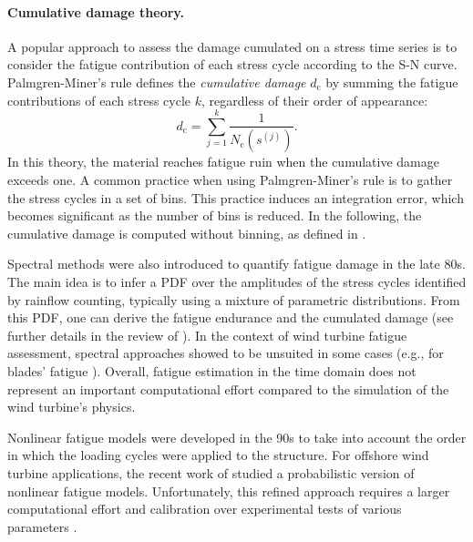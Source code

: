 \paragraph{Cumulative damage theory.}
A popular approach to assess the damage cumulated on a stress time series is to consider the fatigue contribution of each stress cycle according to the S-N curve. 
Palmgren-Miner's rule defines the \textit{cumulative damage} $d_{\mathrm{c}}$ by summing the fatigue contributions of each stress cycle $k$, regardless of their order of appearance:
\begin{equation}
    d_{\mathrm{c}} = \sum_{j=1}^{k} \frac{1}{N_{\mathrm{c}}\left(s^{(j)}\right)}.
    \label{eq:miner}
\end{equation}
In this theory, the material reaches fatigue ruin when the cumulative damage exceeds one.  
A common practice when using Palmgren-Miner's rule is to gather the stress cycles in a set of bins. 
This practice induces an integration error, which becomes significant as the number of bins is reduced. 
In the following, the cumulative damage is computed without binning, as defined in .

Spectral methods were also introduced to quantify fatigue damage in the late 80s. 
The main idea is to infer a PDF over the amplitudes of the stress cycles identified by rainflow counting, typically using a mixture of parametric distributions. 
From this PDF, one can derive the fatigue endurance and the cumulated damage (see further details in the review of \citealp{dirlik_2021}). 
In the context of wind turbine fatigue assessment, spectral approaches showed to be unsuited in some cases (e.g., for blades' fatigue \citealp{ragan_2007_dirlik_vs_miner}).  
Overall, fatigue estimation in the time domain does not represent an important computational effort compared to the simulation of the wind turbine's physics. 

Nonlinear fatigue models were developed in the 90s \citep{fatemi_1998} to take into account the order in which the loading cycles were applied to the structure. 
For offshore wind turbine applications, the recent work of \citet{rocher_2020_nonlinear_fatigue} studied a probabilistic version of nonlinear fatigue models. 
Unfortunately, this refined approach requires a larger computational effort and calibration over experimental tests of various parameters \citep{freyssinet_2023_nonlinear_fatigue}.  


